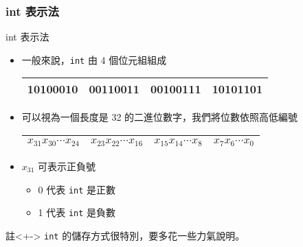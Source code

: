 \documentclass[utf8]{beamer}
\begin{document}
\begin{CJK}{UTF8}{bkai}
\begin{frame}[fragile]
  \frametitle{int 表示法}
  \begin{alertblock}{int 表示法}
    \begin{itemize}[<+->]
    \item 一般來說，\lstinline{int}{} 由 4 個位元組組成
      \begin{table}[h]
      \begin{tabular}{|c|c|c|c|}
      \hline
      10100010 & 00110011 & 00100111 & 10101101\\
      \hline
      \end{tabular}
      \end{table}
    \item 可以視為一個長度是 32 的二進位數字，我們將位數依照高低編號
      \begin{table}[h]
      \begin{tabular}{|c|c|c|c|}
      \hline
      $x_{31}x_{30}\cdots{x_{24}}$ & $x_{23}x_{22}\cdots{x_{16}}$ & $x_{15}x_{14}\cdots{x_{8}}$ & $x_{7}x_{6}\cdots{x_{0}}$\\
      \hline
      \end{tabular}
      \end{table}
    \item $x_{31}$ 可表示正負號
      \begin{itemize}[<+->]
      \item 0 代表 \lstinline{int}{} 是正數
      \item 1 代表 \lstinline{int}{} 是負數
      \end{itemize}
    \end{itemize}
  \end{alertblock}
  \begin{exampleblock}{註}<+->
  \lstinline{int}{} 的儲存方式很特別，要多花一些力氣說明。
  \end{exampleblock}
\end{frame}


\end{CJK}
\end{document}
